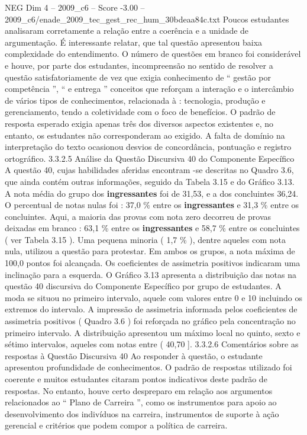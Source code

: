 \begin{textsample}{NEG Dim 4 – 2009\_c6 – Score -3.00 – 2009\_c6/enade\_2009\_tec\_gest\_rec\_hum\_30bdeaa84c.txt}
Poucos estudantes analisaram corretamente a relação entre a coerência e a unidade de argumentação.
É interessante relatar, que tal questão apresentou baixa complexidade do entendimento.
O número de questões em branco foi considerável e houve, por parte dos estudantes, incompreensão no sentido de resolver a questão satisfatoriamente de vez que exigia conhecimento de “ gestão por competência ”, “ e entrega ” conceitos que reforçam a interação e o intercâmbio de vários tipos de conhecimentos, relacionada à : tecnologia, produção e gerenciamento, tendo a coletividade com o foco de benefícios.
O padrão de resposta esperado exigia apenas três dos diversos aspectos existentes e, no entanto, os estudantes não corresponderam ao exigido.
A falta de domínio na interpretação do texto ocasionou desvios de concordância, pontuação e registro ortográfico. 3.3.2.5 Análise da Questão Discursiva 40 do Componente Específico A questão 40, cujas habilidades aferidas encontram -se descritas no Quadro 3.6, que ainda contém outras informações, seguido da Tabela 3.15 e do Gráfico 3.13.
A nota média do grupo dos \textbf{ingressantes} foi de 31,53, e a dos concluintes 36,24.
O percentual de notas nulas foi : 37,0 \% entre os \textbf{ingressantes} e 31,3 \% entre os concluintes.
Aqui, a maioria das provas com nota zero decorreu de provas deixadas em branco : 63,1 \% entre os \textbf{ingressantes} e 58,7 \% entre os concluintes ( ver Tabela 3.15 ).
Uma pequena minoria ( 1,7 \% ), dentre aqueles com nota nula, utilizou a questão para protestar.
Em ambos os grupos, a nota máxima de 100,0 pontos foi alcançada.
Os coeficientes de assimetria positivos indicaram uma inclinação para a esquerda.
O Gráfico 3.13 apresenta a distribuição das notas na questão 40 discursiva do Componente Específico por grupo de estudantes.
A moda se situou no primeiro intervalo, aquele com valores entre 0 e 10 incluindo os extremos do intervalo.
A impressão de assimetria informada pelos coeficientes de assimetria positivos ( Quadro 3.6 ) foi reforçada no gráfico pela concentração no primeiro intervalo.
A distribuição apresentou um máximo local no quinto, sexto e sétimo intervalos, aqueles com notas entre ( 40,70 ]. 3.3.2.6 Comentários sobre as respostas à Questão Discursiva 40 Ao responder à questão, o estudante apresentou profundidade de conhecimentos.
O padrão de respostas utilizado foi coerente e muitos estudantes citaram pontos indicativos deste padrão de respostas.
No entanto, houve certo despreparo em relação aos argumentos relacionados ao “ Plano de Carreira ”, como os instrumentos para apoio ao desenvolvimento dos indivíduos na carreira, instrumentos de suporte à ação gerencial e critérios que podem compor a política de carreira.

\end{textsample}
